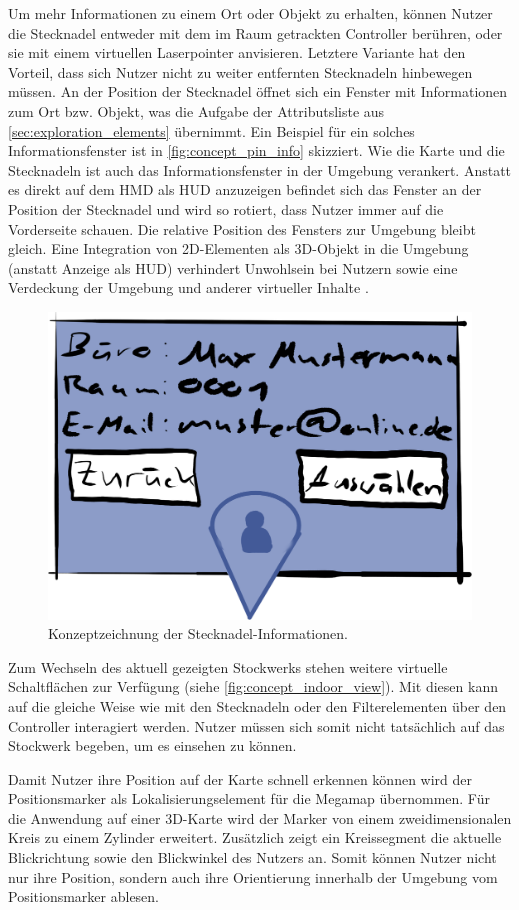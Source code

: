 Um mehr Informationen zu einem Ort oder Objekt zu erhalten, können Nutzer die Stecknadel entweder mit dem im Raum getrackten Controller berühren, oder sie mit einem virtuellen Laserpointer anvisieren.
Letztere Variante hat den Vorteil, dass sich Nutzer nicht zu weiter entfernten Stecknadeln hinbewegen müssen.
An der Position der Stecknadel öffnet sich ein Fenster mit Informationen zum Ort bzw. Objekt, was die Aufgabe der Attributsliste aus \autoref{sec:exploration_elements} übernimmt.
Ein Beispiel für ein solches Informationsfenster ist in \autoref{fig:concept_pin_info} skizziert.
Wie die Karte und die Stecknadeln ist auch das Informationsfenster in der Umgebung verankert.
Anstatt es direkt auf dem HMD als HUD anzuzeigen befindet sich das Fenster an der Position der Stecknadel und wird so rotiert, dass Nutzer immer auf die Vorderseite schauen.
Die relative Position des Fensters zur Umgebung bleibt gleich.
Eine Integration von 2D-Elementen als 3D-Objekt in die Umgebung (anstatt Anzeige als HUD) verhindert Unwohlsein bei Nutzern sowie eine Verdeckung der Umgebung und anderer virtueller Inhalte \parencite{Schroeder2017}.
\begin{figure}[thb]
    \centering
        \includegraphics[width=0.5\linewidth]{figures/concept/concept_location_info}
    \caption{Konzeptzeichnung der Stecknadel-Informationen.}
    \label{fig:concept_pin_info}
\end{figure}

Zum Wechseln des aktuell gezeigten Stockwerks stehen weitere virtuelle Schaltflächen zur Verfügung (siehe \autoref{fig:concept_indoor_view}).
Mit diesen kann auf die gleiche Weise wie mit den Stecknadeln oder den Filterelementen über den Controller interagiert werden.
Nutzer müssen sich somit nicht tatsächlich auf das Stockwerk begeben, um es einsehen zu können.

Damit Nutzer ihre Position auf der Karte schnell erkennen können wird der Positionsmarker als Lokalisierungselement für die Megamap übernommen.
Für die Anwendung auf einer 3D-Karte wird der Marker von einem zweidimensionalen Kreis zu einem Zylinder erweitert.
Zusätzlich zeigt ein Kreissegment die aktuelle Blickrichtung sowie den Blickwinkel des Nutzers an.
Somit können Nutzer nicht nur ihre Position, sondern auch ihre Orientierung innerhalb der Umgebung vom Positionsmarker ablesen.

